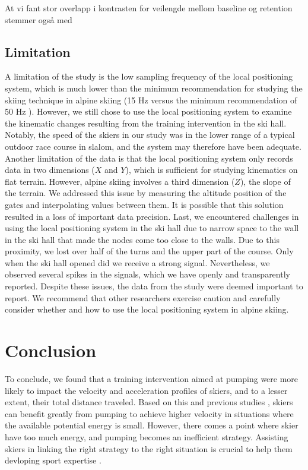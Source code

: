 \documentclass{article}
\begin{document}
At vi fant stor overlapp i kontrasten for veilengde mellom baseline og retention stemmer også med 



\subsection{Limitation}
A limitation of the study is the low sampling frequency of the local positioning system, which is much lower than the minimum recommendation for studying the skiing technique in alpine skiing (15 Hz versus the minimum recommendation of 50 Hz \cite{federolf_quantifying_2012}). However, we still chose to use the local positioning system to examine the kinematic changes resulting from the training intervention in the ski hall. Notably, the speed of the skiers in our study was in the lower range of a typical outdoor race course in slalom, and the system may therefore have been adequate. Another limitation of the data is that the local positioning system only records data in two dimensions ($X$ and $Y$), which is sufficient for studying kinematics on flat terrain. However, alpine skiing involves a third dimension ($Z$), the slope of the terrain. We addressed this issue by measuring the altitude position of the gates and interpolating values between them. It is possible that this solution resulted in a loss of important data precision. Last, we encountered challenges in using the local positioning system in the ski hall due to narrow space to the wall in the ski hall that made the nodes come too close to the walls. Due to this proximity, we lost over half of the turns and the upper part of the course. Only when the ski hall opened did we receive a strong signal. Nevertheless, we observed several spikes in the signals, which we have openly and transparently reported. Despite these issues, the data from the study were deemed important to report.  We recommend that other researchers exercise caution and carefully consider whether and how to use the local positioning system in alpine skiing.

\section{Conclusion}
To conclude, we found that a training intervention aimed at pumping were more likely to impact the velocity and acceleration profiles of skiers, and to a lesser extent, their total distance traveled. Based on this and previous studies \cite{christian_magelssen_reinforcement_2024}, skiers can benefit greatly from pumping to achieve higher velocity in situations where the available potential energy is small. However, there comes a point where skier have too much energy, and pumping becomes an inefficient strategy. Assisting skiers in linking the right strategy to the right situation is crucial to help them devloping sport expertise \cite{krakauer_motor_2019}.
\end{document}
